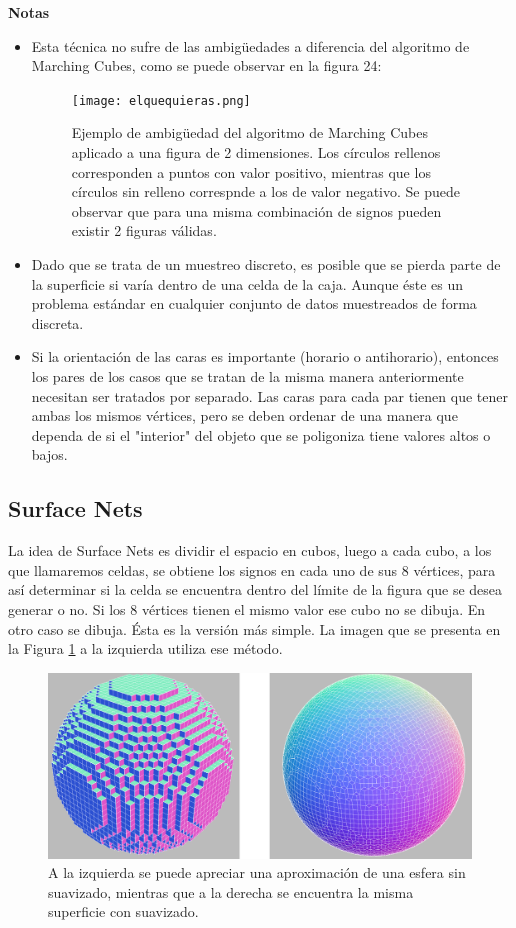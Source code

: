 \documentclass[12pt]{article}
\begin{document}
\textbf{Notas}
\begin{itemize}
\item Esta técnica no sufre de las ambigüedades a diferencia del algoritmo de Marching Cubes, como se puede observar en la figura 24:
\begin{figure}[h!]
\texttt{[image: elquequieras.png]}
\caption{Ejemplo de ambigüedad del algoritmo de Marching Cubes aplicado a una figura de 2 dimensiones. Los círculos rellenos corresponden a puntos con valor positivo, mientras que los círculos sin relleno correspnde a los de valor negativo. Se puede observar que para una misma combinación de signos pueden existir 2 figuras válidas.}
\end{figure}
\item Dado que se trata de un muestreo discreto, es posible que se pierda parte de la superficie si varía dentro de una celda de la caja. Aunque éste es un problema estándar en cualquier conjunto de datos muestreados de forma discreta.
\item Si la orientación de las caras es importante (horario o antihorario), entonces los pares de los casos que se tratan de la misma manera anteriormente necesitan ser tratados por separado. Las caras para cada par tienen que tener ambas los mismos vértices, pero se deben ordenar de una manera que dependa de si el "interior" del objeto que se poligoniza tiene valores altos o bajos.
\end{itemize}

\subsection{Surface Nets}
La idea de Surface Nets es dividir el espacio en cubos, luego a cada cubo, a los que llamaremos celdas, se obtiene los signos en cada uno de sus 8 vértices, para así determinar si la celda se encuentra dentro del límite de la figura que se desea generar o no. Si los 8 vértices tienen el mismo valor ese cubo no se dibuja. En otro caso se dibuja. Ésta es la versión más simple. La imagen que se presenta en la Figura \ref{minecraft} a la izquierda utiliza ese método.
\begin{figure}[h]
\includegraphics[width =\linewidth,center]{snc.png}
\caption{ A la izquierda se puede apreciar una aproximación de una esfera sin suavizado, mientras que a la derecha se encuentra la misma superficie con suavizado.}
\label{minecraft}
\end{figure}
\end{document}
